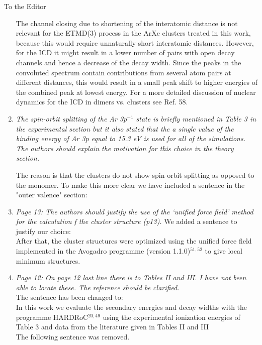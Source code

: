\documentclass[DIN,pagenumber=false,parskip=half,fromalign=left,fromphone=true,fromemail=true,fromurl=false,fromlogo=false,fromrule=false]{scrlttr2}
\begin{document}
\begin{letter}{To the Editor}
\begin{enumerate}
{{The channel closing due to shortening of the interatomic distance is not
relevant for the ETMD(3) process in the ArXe clusters treated in this work,
because this would require unnaturally short interatomic distances.
However, for the ICD it might result in a lower number of pairs with open
decay channels and hence a decrease of the decay width. 
Since the peaks in the convoluted spectrum 
contain contributions from several atom pairs at different distances, 
this would result
in a small peak shift to higher energies of the combined peak at lowest energy.
For a more detailed discussion of nuclear dynamics for the ICD in dimers vs.
clusters see Ref. 58.
}}


 \item \emph{The spin-orbit splitting of the Ar 3p$^{-1}$ state is briefly mentioned in Table 3 in the experimental section but it also stated that the a single value of the binding energy of Ar 3p equal to 15.3 eV is used for all of the simulations. The authors should explain the motivation for this choice in the theory section.}

The reason is that the clusters do not show spin-orbit splitting as opposed to the monomer. To make this more clear we have included a sentence in the "outer valence" section: {}

 \item \emph{Page 13:
       The authors should justify the use of the ‘unified force field’ method for the calculation f the cluster structure (p13).}
       We added a sentence to justify our choice:\\
       After that, the cluster structures were optimized using the unified
       force field implemented in the Avogadro programme
       (version 1.1.0)$^{51,52}$ to give local minimum structures.
       {\color{blue}{ The method
       was chosen due to its low computational cost, the possibility to find
       the next local minimum structure based on the chosen starting point
       and the necessary effort to produce reliable results with density
       functional theory (DFT) for v. d. Waals interactions since in
       this work we discuss structural trends and not absolute structures.}}

 \item \emph{Page 12:
       On page 12 last line there is to Tables II and III. I have not been able to locate these. The reference should be clarified.}\\
       The sentence has been changed to:\\
       In this work we evaluate the secondary energies and decay widths with
       the programme HARDRoC$^{20,49}$ using the experimental ionization energies
       of Table 3 and data from the literature given in Tables II and III
       {\color{blue}{of Ref. 34.}}\\
       The following sentence was removed.


\end{enumerate}
\end{letter}
\end{document}
